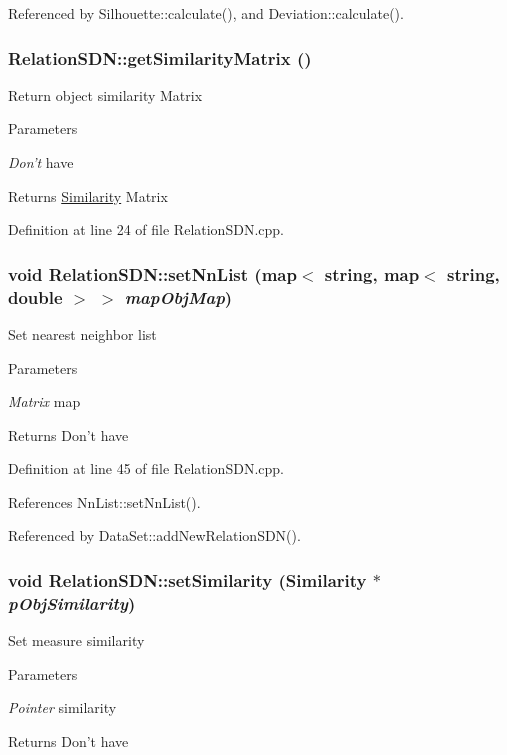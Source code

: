 Referenced by Silhouette::calculate(), and Deviation::calculate().\hypertarget{classRelationSDN_a52f3944e7966f4ea3684069fff04e1a3}{
\subsubsection[{getSimilarityMatrix}]{ RelationSDN::getSimilarityMatrix ()}}
\label{classRelationSDN_a52f3944e7966f4ea3684069fff04e1a3}
Return object similarity Matrix 
\begin{DoxyParams}{Parameters}
\item[{\em Don't}]have \end{DoxyParams}
\begin{DoxyReturn}{Returns}
\hyperlink{classSimilarity}{Similarity} Matrix 
\end{DoxyReturn}


Definition at line 24 of file RelationSDN.cpp.\hypertarget{classRelationSDN_a403418b3fb4ec2be68f91d8b47428885}{
\subsubsection[{setNnList}]{\setlength{\rightskip}{0pt plus 5cm}void RelationSDN::setNnList (map$<$ string, map$<$ string, double $>$ $>$ {\em mapObjMap})}}
\label{classRelationSDN_a403418b3fb4ec2be68f91d8b47428885}
Set nearest neighbor list 
\begin{DoxyParams}{Parameters}
\item[{\em Matrix}]map \end{DoxyParams}
\begin{DoxyReturn}{Returns}
Don't have 
\end{DoxyReturn}


Definition at line 45 of file RelationSDN.cpp.

References NnList::setNnList().

Referenced by DataSet::addNewRelationSDN().\hypertarget{classRelationSDN_ad16b958a06717abf76ff5a96d008534c}{
\subsubsection[{setSimilarity}]{\setlength{\rightskip}{0pt plus 5cm}void RelationSDN::setSimilarity ({\bf Similarity} $\ast$ {\em pObjSimilarity})}}
\label{classRelationSDN_ad16b958a06717abf76ff5a96d008534c}
Set measure similarity 
\begin{DoxyParams}{Parameters}
\item[{\em Pointer}]similarity \end{DoxyParams}
\begin{DoxyReturn}{Returns}
Don't have 
\end{DoxyReturn}


